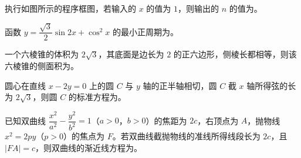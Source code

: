 \Needspace{0.4\textheight}
\begin{question}
执行如图所示的程序框图，若输入的 $x$ 的值为 $1$，则输出的 $n$ 的值为\gkblank{}。
\nopagebreak[4]
\begin{center}\end{center}
\nopagebreak[4]
\end{question}
\begin{question}
函数 $y=\dfrac{\sqrt3}2\sin2x+\cos^2x$ 的最小正周期为\gkblank{}。

\end{question}
\begin{question}
一个六棱锥的体积为 $2\sqrt3$，其底面是边长为 $2$ 的正六边形，侧棱长都相等，则该六棱锥的侧面积为\gkblank{}。

\end{question}
\begin{question}
圆心在直线 $x-2y=0$ 上的圆 $C$ 与 $y$ 轴的正半轴相切，圆 $C$ 截 $x$ 轴所得弦的长为 $2\sqrt3$，则圆 $C$ 的标准方程为\gkblank{}。

\end{question}
\begin{question}
已知双曲线 $\dfrac{x^2}{a^2}-\dfrac{y^2}{b^2}=1$（$a>0$，$b>0$）的焦距为 $2c$，右顶点为 $A$，抛物线 $x^2=2py$（$p>0$）的焦点为 $F$。若双曲线截抛物线的准线所得线段长为 $2c$，且 $|FA|=c$，则双曲线的渐近线方程为\gkblank{}。

\end{question}

